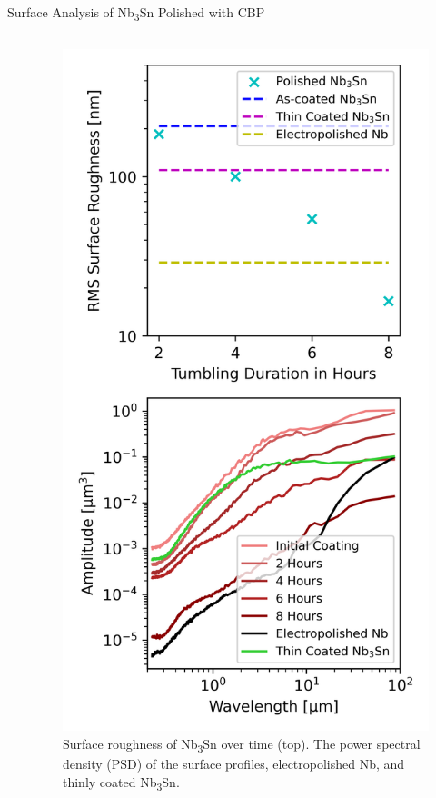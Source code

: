 \documentclass{beamer}
\begin{document}
\begin{frame}{}
\begin{columns}[t]
\begin{column}{0.32\linewidth}
\begin{block}{\label{sec:samplestudy}Surface Analysis of Nb\textsubscript{3}Sn Polished with CBP}
\begin{columns}[t]
\begin{column}{0.4\columnwidth}
                        \end{column}
                        \begin{column}{0.5\columnwidth}
                             \begin{figure}[t]
                                \centering
                                \includegraphics[width=\columnwidth]{../doc/figs/Surface_Roughness_Graph.png}
                                \caption{\label{fig:surfaceroughnessgraph}Surface roughness of Nb\textsubscript{3}Sn over time (top). The power spectral density (PSD) of the surface profiles, electropolished Nb, and thinly coated Nb\textsubscript{3}Sn\cite{posen2021advances}.}
                            \end{figure}
                        \end{column}


\end{columns}
\end{block}
\end{column}
\end{columns}
\end{frame}
\end{document}
